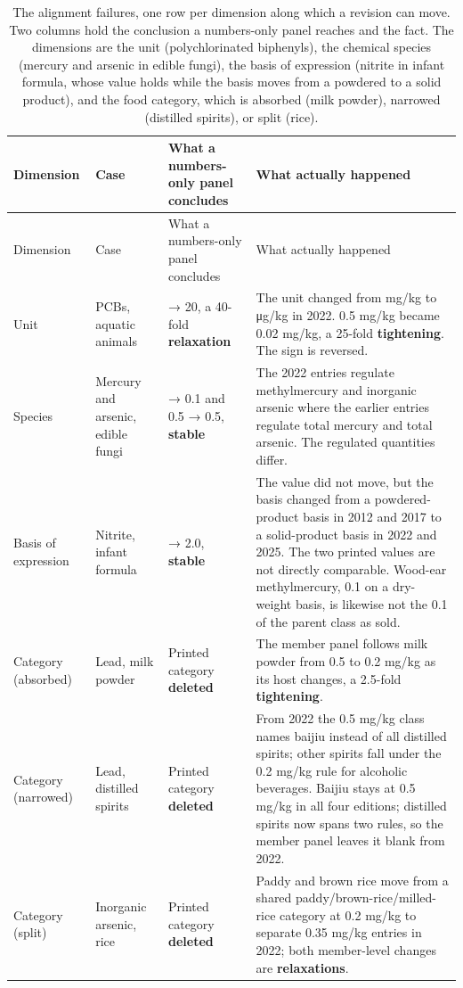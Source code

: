\begin{longtable}[]{@{}>{\raggedright\arraybackslash}p{}>{\raggedright\arraybackslash}p{}>{\raggedright\arraybackslash}p{}>{\raggedright\arraybackslash}p{}@{}}
\caption{The alignment failures, one row per dimension along which a revision can move. Two columns hold the conclusion a numbers-only panel reaches and the fact. The dimensions are the unit (polychlorinated biphenyls), the chemical species (mercury and arsenic in edible fungi), the basis of expression (nitrite in infant formula, whose value holds while the basis moves from a powdered to a solid product), and the food category, which is absorbed (milk powder), narrowed (distilled spirits), or split (rice).}\label{tab1AlignmentFailures}\tabularnewline
\toprule
Dimension & Case & What a numbers-only panel concludes & What actually happened \\
\midrule
\endfirsthead
\toprule
Dimension & Case & What a numbers-only panel concludes & What actually happened \\
\midrule
\endhead
Unit & PCBs, aquatic animals & 0.5 → 20, a 40-fold \textbf{relaxation} & The unit changed from mg/kg to μg/kg in 2022. 0.5 mg/kg became 0.02 mg/kg, a 25-fold \textbf{tightening}. The sign is reversed. \\
Species & Mercury and arsenic, edible fungi & 0.1 → 0.1 and 0.5 → 0.5, \textbf{stable} & The 2022 entries regulate methylmercury and inorganic arsenic where the earlier entries regulate total mercury and total arsenic. The regulated quantities differ. \\
Basis of expression & Nitrite, infant formula & 2.0 → 2.0, \textbf{stable} & The value did not move, but the basis changed from a powdered-product basis in 2012 and 2017 to a solid-product basis in 2022 and 2025. The two printed values are not directly comparable. Wood-ear methylmercury, 0.1 on a dry-weight basis, is likewise not the 0.1 of the parent class as sold. \\
Category (absorbed) & Lead, milk powder & Printed category \textbf{deleted} & The member panel follows milk powder from 0.5 to 0.2 mg/kg as its host changes, a 2.5-fold \textbf{tightening}. \\
Category (narrowed) & Lead, distilled spirits & Printed category \textbf{deleted} & From 2022 the 0.5 mg/kg class names baijiu instead of all distilled spirits; other spirits fall under the 0.2 mg/kg rule for alcoholic beverages. Baijiu stays at 0.5 mg/kg in all four editions; distilled spirits now spans two rules, so the member panel leaves it blank from 2022. \\
Category (split) & Inorganic arsenic, rice & Printed category \textbf{deleted} & Paddy and brown rice move from a shared paddy/brown-rice/milled-rice category at 0.2 mg/kg to separate 0.35 mg/kg entries in 2022; both member-level changes are \textbf{relaxations}. \\
\bottomrule
\end{longtable}
